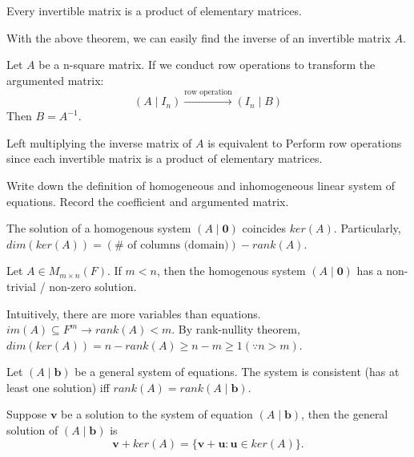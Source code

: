\documentclass[12pt]{article}
\begin{document}
\begin{theorem}
    Every invertible matrix is a product of elementary matrices.
\end{theorem}

With the above theorem, we can easily find the inverse of an invertible matrix $A$.
\begin{theorem}
    Let $A$ be a n-square matrix. If we conduct row operations to transform the argumented matrix:
    \[(A\mid I_n)\xrightarrow{\text{row operation}}(I_n\mid B)\]
    Then $B=A^{-1}$.
\end{theorem}

\begin{pfbox}
    Left multiplying the inverse matrix of $A$ is equivalent to Perform row operations since each invertible matrix is a product of elementary matrices.
\end{pfbox}


\begin{exercise}
    Write down the definition of homogeneous and inhomogeneous linear system of equations. Record the coefficient and argumented matrix.
\end{exercise}

\begin{theorem}
    The solution of a homogenous system $(A\mid \mathbf{0})$ coincides $ker(A)$.
    Particularly, $dim(ker(A))=(\#\text{ of columns (domain)}) - rank(A).$
\end{theorem}

\begin{theorem}
    Let $A\in M_{m\times n}(F)$. If $m<n$, then the homogenous system $(A\mid \mathbf{0})$ has a non-trivial / non-zero solution.
\end{theorem}

\begin{pfbox}
    Intuitively, there are more variables than equations. \\
    $im(A)\subseteq F^m\rightarrow rank(A)<m$. By rank-nullity theorem, $dim(ker(A))=n-rank(A)\geq n-m\geq 1 (\because n>m)$.
\end{pfbox}


\begin{theorem}
    Let $(A\mid\mathbf{b})$ be a general system of equations.
    The system is consistent (has at least one solution) iff $rank(A)=rank(A\mid \mathbf{b})$.
\end{theorem}

\begin{theorem}
Suppose $\mathbf{v}$ be a solution to the system of equation $(A\mid\mathbf{b})$,
then the general solution of $(A\mid\mathbf{b})$ is
\[\mathbf{v}+ker(A)=\{\mathbf{v}+\mathbf{u}:\mathbf{u}\in ker(A)\}.\]
\end{theorem}
\end{document}
